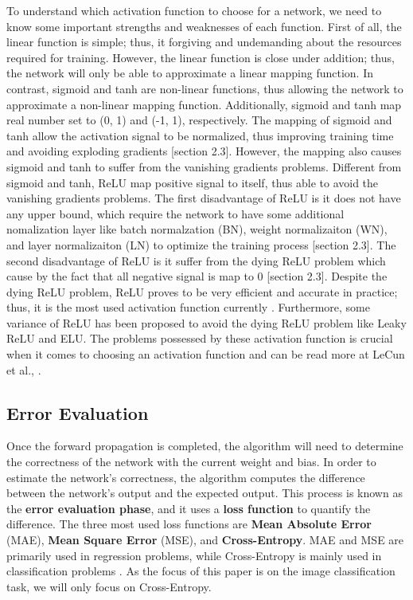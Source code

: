To understand which activation function to choose for a network, we need to know some important strengths and weaknesses of each function. First of all, the linear function is simple; thus, it forgiving and undemanding about the resources required for training. However, the linear function is close under addition; thus, the network will only be able to approximate a linear mapping function. In contrast, sigmoid and tanh are non-linear functions, thus allowing the network to approximate a non-linear mapping function. Additionally, sigmoid and tanh map real number set to (0, 1) and (-1, 1), respectively. The mapping of sigmoid and tanh allow the activation signal to be normalized, thus improving training time and avoiding exploding gradients \cite{lecun2015deep} {\color{red} [section 2.3]}. However, the mapping also causes sigmoid and tanh to suffer from the vanishing gradients problems. Different from sigmoid and tanh, ReLU map positive signal to itself, thus able to avoid the vanishing gradients problems. The first disadvantage of ReLU is it does not have any upper bound, which require the network to have some additional nomalization layer like batch normalzation (BN), weight normalizaiton (WN), and layer normalizaiton (LN) to optimize the training process \cite{relu_optimization_2020} {\color{red} [section 2.3]}. The second disadvantage of ReLU is it suffer from the dying ReLU problem which cause by the fact that all negative signal is map to 0 {\color{red} [section 2.3]}. Despite the dying ReLU problem, ReLU proves to be very efficient and accurate in practice; thus, it is the most used activation function currently \cite{li2021survey}. Furthermore, some variance of ReLU has been proposed to avoid the dying ReLU problem like Leaky ReLU and ELU. The problems possessed by these activation function is crucial when it comes to choosing an activation function and can be read more at LeCun et al., \cite{lecun2015deep}.

\subsection{Error Evaluation}
Once the forward propagation is completed, the algorithm will need to determine the correctness of the network with the current weight and bias. In order to estimate the network's correctness, the algorithm computes the difference between the network's output and the expected output. This process is known as the \textbf{error evaluation phase}, and it uses a \textbf{loss function} to quantify the difference. The three most used loss functions are \textbf{Mean Absolute Error} (MAE), \textbf{Mean Square Error} (MSE), and \textbf{Cross-Entropy}. MAE and MSE are primarily used in regression problems, while Cross-Entropy is mainly used in classification problems \cite{li2021survey}. As the focus of this paper is on the image classification task, we will only focus on Cross-Entropy.


